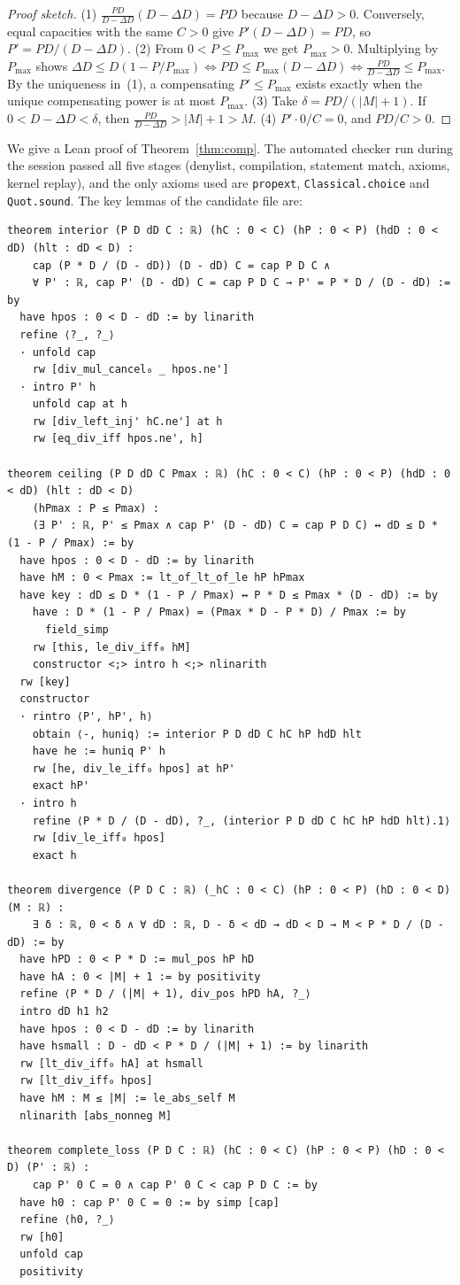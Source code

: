 \documentclass[11pt]{article}
\theoremstyle{remark}
\begin{document}
\begin{proof}[Proof sketch]
(1) $\frac{PD}{D-\Delta D}(D-\Delta D)=PD$ because $D-\Delta D>0$. Conversely, equal capacities
with the same $C>0$ give $P'(D-\Delta D)=PD$, so $P'=PD/(D-\Delta D)$.
(2) From $0<P\le P_{\max}$ we get $P_{\max}>0$. Multiplying by $P_{\max}$ shows
$\Delta D\le D(1-P/P_{\max})\iff PD\le P_{\max}(D-\Delta D)\iff
\tfrac{PD}{D-\Delta D}\le P_{\max}$. By the uniqueness in~(1), a compensating $P'\le P_{\max}$
exists exactly when the unique compensating power is at most $P_{\max}$.
(3) Take $\delta=PD/(|M|+1)$. If $0<D-\Delta D<\delta$, then
$\tfrac{PD}{D-\Delta D}>|M|+1>M$.
(4) $P'\cdot0/C=0$, and $PD/C>0$.
\end{proof}

We give a Lean proof of Theorem~\ref{thm:comp}. The automated checker run during the session
passed all five stages (denylist, compilation, statement match, axioms, kernel replay), and the
only axioms used are \texttt{propext}, \texttt{Classical.choice} and \texttt{Quot.sound}. The
key lemmas of the candidate file are:
\begin{lstlisting}
theorem interior (P D dD C : ℝ) (hC : 0 < C) (hP : 0 < P) (hdD : 0 < dD) (hlt : dD < D) :
    cap (P * D / (D - dD)) (D - dD) C = cap P D C ∧
    ∀ P' : ℝ, cap P' (D - dD) C = cap P D C → P' = P * D / (D - dD) := by
  have hpos : 0 < D - dD := by linarith
  refine ⟨?_, ?_⟩
  · unfold cap
    rw [div_mul_cancel₀ _ hpos.ne']
  · intro P' h
    unfold cap at h
    rw [div_left_inj' hC.ne'] at h
    rw [eq_div_iff hpos.ne', h]

theorem ceiling (P D dD C Pmax : ℝ) (hC : 0 < C) (hP : 0 < P) (hdD : 0 < dD) (hlt : dD < D)
    (hPmax : P ≤ Pmax) :
    (∃ P' : ℝ, P' ≤ Pmax ∧ cap P' (D - dD) C = cap P D C) ↔ dD ≤ D * (1 - P / Pmax) := by
  have hpos : 0 < D - dD := by linarith
  have hM : 0 < Pmax := lt_of_lt_of_le hP hPmax
  have key : dD ≤ D * (1 - P / Pmax) ↔ P * D ≤ Pmax * (D - dD) := by
    have : D * (1 - P / Pmax) = (Pmax * D - P * D) / Pmax := by
      field_simp
    rw [this, le_div_iff₀ hM]
    constructor <;> intro h <;> nlinarith
  rw [key]
  constructor
  · rintro ⟨P', hP', h⟩
    obtain ⟨-, huniq⟩ := interior P D dD C hC hP hdD hlt
    have he := huniq P' h
    rw [he, div_le_iff₀ hpos] at hP'
    exact hP'
  · intro h
    refine ⟨P * D / (D - dD), ?_, (interior P D dD C hC hP hdD hlt).1⟩
    rw [div_le_iff₀ hpos]
    exact h

theorem divergence (P D C : ℝ) (_hC : 0 < C) (hP : 0 < P) (hD : 0 < D) (M : ℝ) :
    ∃ δ : ℝ, 0 < δ ∧ ∀ dD : ℝ, D - δ < dD → dD < D → M < P * D / (D - dD) := by
  have hPD : 0 < P * D := mul_pos hP hD
  have hA : 0 < |M| + 1 := by positivity
  refine ⟨P * D / (|M| + 1), div_pos hPD hA, ?_⟩
  intro dD h1 h2
  have hpos : 0 < D - dD := by linarith
  have hsmall : D - dD < P * D / (|M| + 1) := by linarith
  rw [lt_div_iff₀ hA] at hsmall
  rw [lt_div_iff₀ hpos]
  have hM : M ≤ |M| := le_abs_self M
  nlinarith [abs_nonneg M]

theorem complete_loss (P D C : ℝ) (hC : 0 < C) (hP : 0 < P) (hD : 0 < D) (P' : ℝ) :
    cap P' 0 C = 0 ∧ cap P' 0 C < cap P D C := by
  have h0 : cap P' 0 C = 0 := by simp [cap]
  refine ⟨h0, ?_⟩
  rw [h0]
  unfold cap
  positivity
\end{lstlisting}
\end{document}
